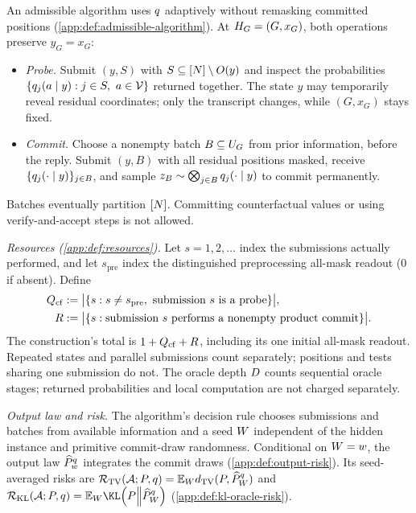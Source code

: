 \begingroup\color{red}
\begin{definition}
\label{main:def:algorithm-risk-resources}
An admissible algorithm uses $\FrozenOracle$ adaptively without remasking
committed positions (\cref{app:def:admissible-algorithm}).
At $\History=(G,x_G)$, both operations preserve $y_G=x_G$:
\begingroup
\setlength{\leftmargini}{2pc}
\begin{itemize}
\item \emph{Probe.} Submit $(y,S)$ with
$S\subseteq\PositionSet\setminus\ObservedSet{y}$ and inspect the probabilities
$\{\OracleRowMass{y}{j}{a}:j\in S,\ a\in\Vocab\}$ returned together.
The state $y$ may temporarily reveal residual coordinates;
only the transcript changes, while $(G,x_G)$ stays fixed.
\item \emph{Commit.} Choose a nonempty batch $B\subseteq\ResidualPositions$
from prior information, before the reply. Submit $(y,B)$ with all residual
positions masked, receive $\{\OracleRow{y}{j}\}_{j\in B}$, and sample
$z_B\sim\bigotimes_{j\in B}\OracleRow{y}{j}$ to commit permanently.
\end{itemize}
\endgroup
Batches eventually partition $\PositionSet$.
Committing counterfactual values or using verify-and-accept steps is not allowed.

\emph{Resources (\cref{app:def:resources}).}
Let $s=1,2,\ldots$ index the submissions actually performed, and let
$s_{\mathrm{pre}}$ index the distinguished preprocessing all-mask readout
($0$ if absent). Define
\[
\begin{aligned}
 \CounterfactualQueries
 &:=\bigl|\{s:s\ne s_{\mathrm{pre}},\ \text{submission }s\text{ is a probe}\}\bigr|,\\
 \CommitRounds
 &:=\bigl|\{s:\text{submission }s\text{ performs a nonempty product commit}\}\bigr|.
\end{aligned}
\]
The construction's total is $1+\CounterfactualQueries+\CommitRounds$,
including its one initial all-mask readout. Repeated states and parallel
submissions count separately; positions and tests sharing one submission do not.
The oracle depth $\OracleDepth$ counts sequential oracle stages; returned probabilities and
local computation are not charged separately.

\emph{Output law and risk.}
The algorithm's decision rule chooses submissions and batches from available
information and a seed $\ControllerSeed$ independent of the hidden instance
and primitive commit-draw randomness. Conditional on $\ControllerSeed=w$,
the output law $\SamplerOutputLaw{w}{\FrozenOracle}$ integrates the commit draws
(\cref{app:def:output-risk}). Its seed-averaged risks are
$\SeedRisk(\mathcal A;\TargetLaw,\FrozenOracle)
 =\mathbb E_{\ControllerSeed}
   \dTV(\TargetLaw,\SamplerOutputLaw{\ControllerSeed}{\FrozenOracle})$
and $\KLSeedRisk(\mathcal A;\TargetLaw,\FrozenOracle)
 =\mathbb E_{\ControllerSeed}\KLDivergence{\TargetLaw}
   {\SamplerOutputLaw{\ControllerSeed}{\FrozenOracle}}$
(\cref{app:def:kl-oracle-risk}).
\end{definition}
\endgroup

